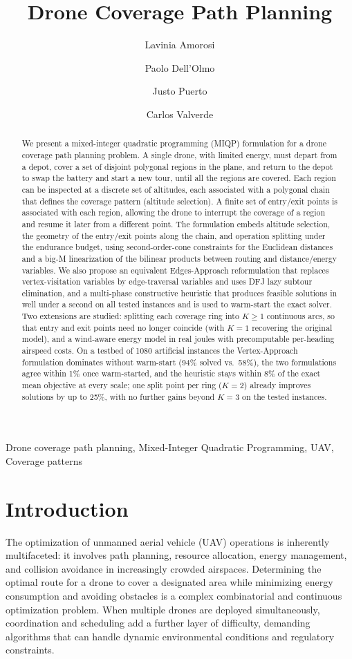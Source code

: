 \documentclass[12pt]{elsarticle}
\title{Drone Coverage Path Planning}
\author[mymainaddress]{Lavinia Amorosi}
\author[mymainaddress]{Paolo Dell'Olmo}
\author[mysecondaryaddress]{Justo Puerto}
\author[mysecondaryaddress]{Carlos Valverde \corref{mycorrespondingauthor}}
\begin{document}
\begin{frontmatter}


\begin{abstract}
We present a mixed-integer quadratic programming (MIQP) formulation for a drone coverage path planning problem. A single drone, with limited energy, must depart from a depot, cover a set of disjoint polygonal regions in the plane, and return to the depot to swap the battery and start a new tour, until all the regions are covered. Each region can be inspected at a discrete set of altitudes, each associated with a polygonal chain that defines the coverage pattern (altitude selection). A finite set of entry/exit points is associated with each region, allowing the drone to interrupt the coverage of a region and resume it later from a different point. The formulation embeds altitude selection, the geometry of the entry/exit points along the chain, and operation splitting under the endurance budget, using second-order-cone constraints for the Euclidean distances and a big-M linearization of the bilinear products between routing and distance/energy variables. We also propose an equivalent Edges-Approach reformulation that replaces vertex-visitation variables by edge-traversal variables and uses DFJ lazy subtour elimination, and a multi-phase constructive heuristic that produces feasible solutions in well under a second on all tested instances and is used to warm-start the exact solver. Two extensions are studied: splitting each coverage ring into $K\ge 1$ continuous arcs, so that entry and exit points need no longer coincide (with $K=1$ recovering the original model), and a wind-aware energy model in real joules with precomputable per-heading airspeed costs. On a testbed of 1080 artificial instances the Vertex-Approach formulation dominates without warm-start (94\% solved vs.\ 58\%), the two formulations agree within 1\% once warm-started, and the heuristic stays within 8\% of the exact mean objective at every scale; one split point per ring ($K=2$) already improves solutions by up to 25\%, with no further gains beyond $K=3$ on the tested instances.
\end{abstract}
\begin{keyword}
Drone coverage path planning, Mixed-Integer Quadratic Programming, UAV, Coverage patterns
\end{keyword}

\end{frontmatter}
\section{Introduction}
The optimization of unmanned aerial vehicle (UAV) operations is inherently multifaceted: it involves path planning, resource allocation, energy management, and collision avoidance in increasingly crowded airspaces. Determining the optimal route for a drone to cover a designated area while minimizing energy consumption and avoiding obstacles is a complex combinatorial and continuous optimization problem. When multiple drones are deployed simultaneously, coordination and scheduling add a further layer of difficulty, demanding algorithms that can handle dynamic environmental conditions and regulatory constraints.
\end{document}
